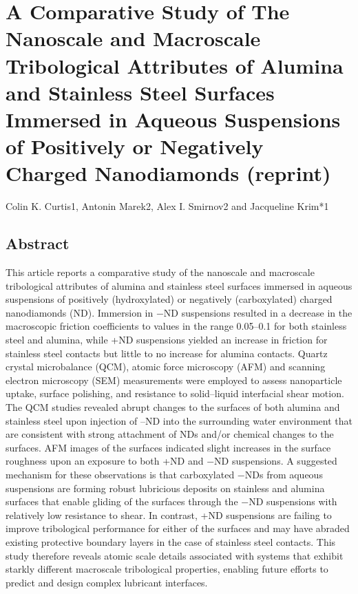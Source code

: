\chapter{A Comparative Study of The Nanoscale and Macroscale Tribological Attributes of Alumina and Stainless Steel Surfaces Immersed in Aqueous Suspensions of Positively or Negatively Charged Nanodiamonds (reprint)}
\label{chap-five}

Colin K. Curtis1, Antonin Marek2, Alex I. Smirnov2 and Jacqueline Krim*1

\section{Abstract}

This article reports a comparative study of the nanoscale and macroscale tribological attributes of alumina and stainless steel surfaces immersed in aqueous suspensions of positively (hydroxylated) or negatively (carboxylated) charged nanodiamonds (ND). Immersion in −ND suspensions resulted in a decrease in the macroscopic friction coefficients to values in the range 0.05–0.1 for both stainless steel and alumina, while +ND suspensions yielded an increase in friction for stainless steel contacts but little to no increase for alumina contacts. Quartz crystal microbalance (QCM), atomic force microscopy (AFM) and scanning electron microscopy (SEM) measurements were employed to assess nanoparticle uptake, surface polishing, and resistance to solid–liquid interfacial shear motion. The QCM studies revealed abrupt changes to the surfaces of both alumina and stainless steel upon injection of –ND into the surrounding water environment that are consistent with strong attachment of NDs and/or chemical changes to the surfaces. AFM images of the surfaces indicated slight increases in the surface roughness upon an exposure to both +ND and −ND suspensions. A suggested mechanism for these observations is that carboxylated −NDs from aqueous suspensions are forming robust lubricious deposits on stainless and alumina surfaces that enable gliding of the surfaces through the −ND suspensions with relatively low resistance to shear. In contrast, +ND suspensions are failing to improve tribological performance for either of the surfaces and may have abraded existing protective boundary layers in the case of stainless steel contacts. This study therefore reveals atomic scale details associated with systems that exhibit starkly different macroscale tribological properties, enabling future efforts to predict and design complex lubricant interfaces.


